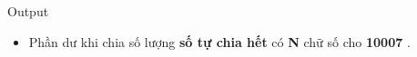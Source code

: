 Output
\begin{itemize}
	\item Phần dư khi chia số lượng \textbf{ số tự chia hết } có \textbf{ N } chữ số cho \textbf{ 10007 } .
\end{itemize}